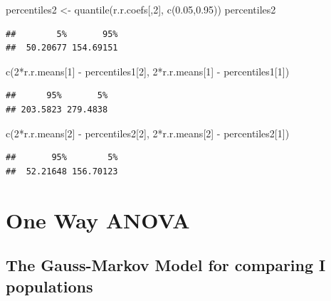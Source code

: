 \documentclass[
]{book}
\newenvironment{Shaded}{\begin{snugshade}}{\end{snugshade}}
\newcommand{\DecValTok}[1]{\textcolor[rgb]{0.00,0.00,0.81}{#1}}
\newcommand{\FloatTok}[1]{\textcolor[rgb]{0.00,0.00,0.81}{#1}}
\newcommand{\FunctionTok}[1]{\textcolor[rgb]{0.00,0.00,0.00}{#1}}
\newcommand{\NormalTok}[1]{#1}
\newcommand{\OtherTok}[1]{\textcolor[rgb]{0.56,0.35,0.01}{#1}}
\newcommand{\SpecialCharTok}[1]{\textcolor[rgb]{0.00,0.00,0.00}{#1}}
\begin{document}
\begin{Shaded}
\begin{Highlighting}[]
\NormalTok{percentiles2 }\OtherTok{\textless{}{-}} \FunctionTok{quantile}\NormalTok{(r.r.coefs[,}\DecValTok{2}\NormalTok{], }\FunctionTok{c}\NormalTok{(}\FloatTok{0.05}\NormalTok{,}\FloatTok{0.95}\NormalTok{))}
\NormalTok{percentiles2}
\end{Highlighting}
\end{Shaded}

\begin{verbatim}
##        5%       95% 
##  50.20677 154.69151
\end{verbatim}

\begin{Shaded}
\begin{Highlighting}[]
\FunctionTok{c}\NormalTok{(}\DecValTok{2}\SpecialCharTok{*}\NormalTok{r.r.means[}\DecValTok{1}\NormalTok{] }\SpecialCharTok{{-}}\NormalTok{ percentiles1[}\DecValTok{2}\NormalTok{], }\DecValTok{2}\SpecialCharTok{*}\NormalTok{r.r.means[}\DecValTok{1}\NormalTok{] }\SpecialCharTok{{-}}\NormalTok{ percentiles1[}\DecValTok{1}\NormalTok{])}
\end{Highlighting}
\end{Shaded}

\begin{verbatim}
##      95%       5% 
## 203.5823 279.4838
\end{verbatim}

\begin{Shaded}
\begin{Highlighting}[]
\FunctionTok{c}\NormalTok{(}\DecValTok{2}\SpecialCharTok{*}\NormalTok{r.r.means[}\DecValTok{2}\NormalTok{] }\SpecialCharTok{{-}}\NormalTok{ percentiles2[}\DecValTok{2}\NormalTok{], }\DecValTok{2}\SpecialCharTok{*}\NormalTok{r.r.means[}\DecValTok{2}\NormalTok{] }\SpecialCharTok{{-}}\NormalTok{ percentiles2[}\DecValTok{1}\NormalTok{])}
\end{Highlighting}
\end{Shaded}

\begin{verbatim}
##       95%        5% 
##  52.21648 156.70123
\end{verbatim}

\hypertarget{one-way-anova}{%
\chapter{One Way ANOVA}\label{one-way-anova}}

\hypertarget{the-gauss-markov-model-for-comparing-i-populations}{%
\section{The Gauss-Markov Model for comparing I populations}\label{the-gauss-markov-model-for-comparing-i-populations}}
\end{document}
